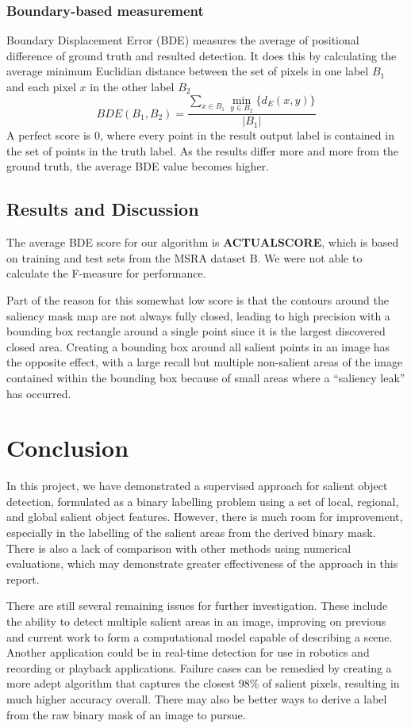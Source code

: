 \documentclass[10pt,twocolumn,letterpaper]{article}
\newcommand{\SUM}{\sum\limits}
\newcommand{\BOLD}{\textbf}
\begin{document}
\subsubsection{Boundary-based measurement}
Boundary Displacement Error (BDE) measures the average of positional difference of ground truth and resulted detection.  It does this by calculating the average minimum Euclidian distance between the set of pixels in one label $B_1$ and each pixel $x$ in the other label $B_2$ \cite{bde} $$BDE(B_1,B_2)=\frac{\SUM_{x\in B_1}\min\limits_{y\in B_2}\{d_E(x,y)\}}{|B_1|}$$  A perfect score is 0, where every point in the result output label is contained in the set of points in the truth label.  As the results differ more and more from the ground truth, the average BDE value becomes higher.

\subsection{Results and Discussion}
The average BDE score for our algorithm is \BOLD{ACTUALSCORE}, which is based on training and test sets from the MSRA dataset B.  We were not able to calculate the F-measure for performance.

Part of the reason for this somewhat low score is that the contours around the saliency mask map are not always fully closed, leading to high precision with a bounding box rectangle around a single point since it is the largest discovered closed area.  Creating a bounding box around all salient points in an image has the opposite effect, with a large recall but multiple non-salient areas of the image contained within the bounding box because of small areas where a ``saliency leak'' has occurred.

\section{Conclusion}
In this project, we have demonstrated a supervised approach for salient object detection, formulated as a binary labelling problem using a set of local, regional, and global salient object features.  However, there is much room for improvement, especially in the labelling of the salient areas from the derived binary mask.  There is also a lack of comparison with other methods using numerical evaluations, which may demonstrate greater effectiveness of the approach in this report.

There are still several remaining issues for further investigation.  These include the ability to detect multiple salient areas in an image, improving on previous and current work to form a computational model capable of describing a scene.  Another application could be in real-time detection for use in robotics and recording or playback applications.  Failure cases can be remedied by creating a more adept algorithm that captures the closest 98\% of salient pixels, resulting in much higher accuracy overall.  There may also be better ways to derive a label from the raw binary mask of an image to pursue.
\end{document}
